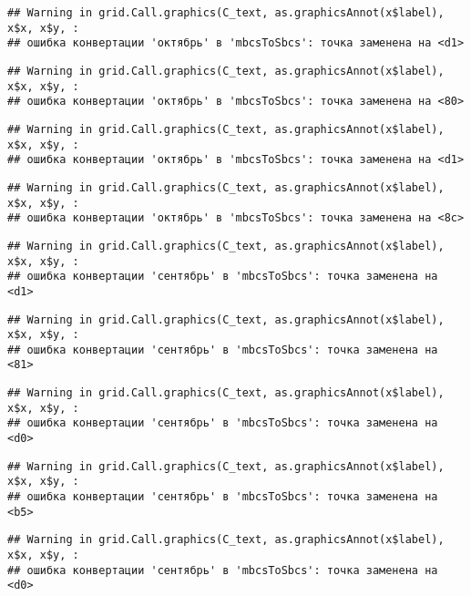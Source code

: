 \documentclass[
]{article}
\begin{document}
\begin{verbatim}
## Warning in grid.Call.graphics(C_text, as.graphicsAnnot(x$label), x$x, x$y, :
## ошибка конвертации 'октябрь' в 'mbcsToSbcs': точка заменена на <d1>
\end{verbatim}

\begin{verbatim}
## Warning in grid.Call.graphics(C_text, as.graphicsAnnot(x$label), x$x, x$y, :
## ошибка конвертации 'октябрь' в 'mbcsToSbcs': точка заменена на <80>
\end{verbatim}

\begin{verbatim}
## Warning in grid.Call.graphics(C_text, as.graphicsAnnot(x$label), x$x, x$y, :
## ошибка конвертации 'октябрь' в 'mbcsToSbcs': точка заменена на <d1>
\end{verbatim}

\begin{verbatim}
## Warning in grid.Call.graphics(C_text, as.graphicsAnnot(x$label), x$x, x$y, :
## ошибка конвертации 'октябрь' в 'mbcsToSbcs': точка заменена на <8c>
\end{verbatim}

\begin{verbatim}
## Warning in grid.Call.graphics(C_text, as.graphicsAnnot(x$label), x$x, x$y, :
## ошибка конвертации 'сентябрь' в 'mbcsToSbcs': точка заменена на <d1>
\end{verbatim}

\begin{verbatim}
## Warning in grid.Call.graphics(C_text, as.graphicsAnnot(x$label), x$x, x$y, :
## ошибка конвертации 'сентябрь' в 'mbcsToSbcs': точка заменена на <81>
\end{verbatim}

\begin{verbatim}
## Warning in grid.Call.graphics(C_text, as.graphicsAnnot(x$label), x$x, x$y, :
## ошибка конвертации 'сентябрь' в 'mbcsToSbcs': точка заменена на <d0>
\end{verbatim}

\begin{verbatim}
## Warning in grid.Call.graphics(C_text, as.graphicsAnnot(x$label), x$x, x$y, :
## ошибка конвертации 'сентябрь' в 'mbcsToSbcs': точка заменена на <b5>
\end{verbatim}

\begin{verbatim}
## Warning in grid.Call.graphics(C_text, as.graphicsAnnot(x$label), x$x, x$y, :
## ошибка конвертации 'сентябрь' в 'mbcsToSbcs': точка заменена на <d0>
\end{verbatim}
\end{document}

